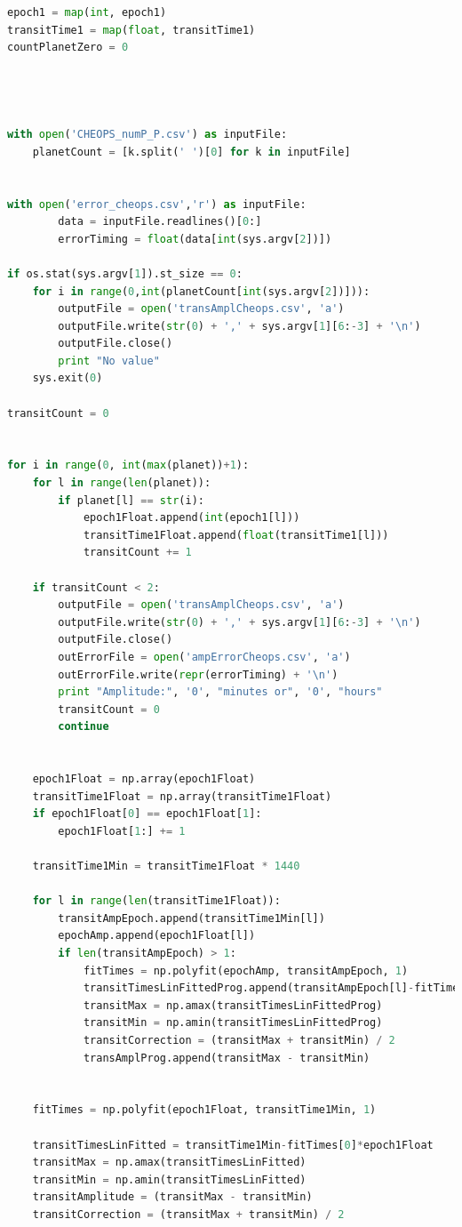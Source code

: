 \documentclass[12pt]{report}
\begin{document}
\begin{appendix}
\begin{lstlisting}[language=Python]
epoch1 = map(int, epoch1)
transitTime1 = map(float, transitTime1)
countPlanetZero = 0


	

with open('CHEOPS_numP_P.csv') as inputFile:
	planetCount = [k.split(' ')[0] for k in inputFile]


with open('error_cheops.csv','r') as inputFile:
		data = inputFile.readlines()[0:]
		errorTiming = float(data[int(sys.argv[2])])

if os.stat(sys.argv[1]).st_size == 0:
	for i in range(0,int(planetCount[int(sys.argv[2])])):
		outputFile = open('transAmplCheops.csv', 'a')
		outputFile.write(str(0) + ',' + sys.argv[1][6:-3] + '\n')
		outputFile.close()
		print "No value"
	sys.exit(0)
		
transitCount = 0


for i in range(0, int(max(planet))+1): 
	for l in range(len(planet)):
		if planet[l] == str(i):
			epoch1Float.append(int(epoch1[l]))
			transitTime1Float.append(float(transitTime1[l]))
			transitCount += 1

	if transitCount < 2:
		outputFile = open('transAmplCheops.csv', 'a')
		outputFile.write(str(0) + ',' + sys.argv[1][6:-3] + '\n')
		outputFile.close()
		outErrorFile = open('ampErrorCheops.csv', 'a')
		outErrorFile.write(repr(errorTiming) + '\n')
		print "Amplitude:", '0', "minutes or", '0', "hours"
		transitCount = 0
		continue
	

	epoch1Float = np.array(epoch1Float)
	transitTime1Float = np.array(transitTime1Float)
	if epoch1Float[0] == epoch1Float[1]:
		epoch1Float[1:] += 1

	transitTime1Min = transitTime1Float * 1440

	for l in range(len(transitTime1Float)):
		transitAmpEpoch.append(transitTime1Min[l])
		epochAmp.append(epoch1Float[l])
		if len(transitAmpEpoch) > 1:
			fitTimes = np.polyfit(epochAmp, transitAmpEpoch, 1)
			transitTimesLinFittedProg.append(transitAmpEpoch[l]-fitTimes[0]*epoch1Float[l])
			transitMax = np.amax(transitTimesLinFittedProg)
			transitMin = np.amin(transitTimesLinFittedProg)
			transitCorrection = (transitMax + transitMin) / 2	
			transAmplProg.append(transitMax - transitMin)
			
			
	fitTimes = np.polyfit(epoch1Float, transitTime1Min, 1)

	transitTimesLinFitted = transitTime1Min-fitTimes[0]*epoch1Float
	transitMax = np.amax(transitTimesLinFitted)
	transitMin = np.amin(transitTimesLinFitted)
	transitAmplitude = (transitMax - transitMin)
	transitCorrection = (transitMax + transitMin) / 2



\end{lstlisting}
\end{appendix}
\end{document}
